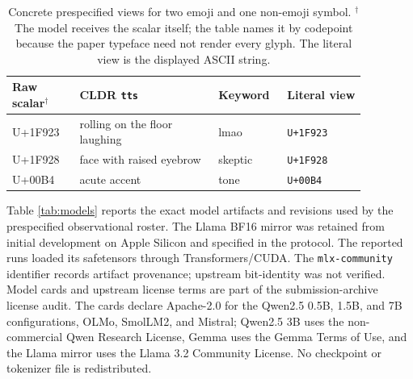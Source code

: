 \documentclass{article}
\begin{document}
\begin{table}[H]
\centering
\scriptsize
\setlength{\tabcolsep}{2.5pt}
\begin{tabular}{p{0.17\linewidth}p{0.35\linewidth}p{0.15\linewidth}p{0.20\linewidth}}
\toprule
Raw scalar$^\dagger$ & CLDR \texttt{tts} & Keyword & Literal view \\
\midrule
U+1F923 & rolling on the floor laughing & lmao & \texttt{U+1F923} \\
U+1F928 & face with raised eyebrow & skeptic & \texttt{U+1F928} \\
U+00B4  & acute accent & tone & \texttt{U+00B4} \\
\bottomrule
\end{tabular}
\caption{Concrete prespecified views for two emoji and one non-emoji symbol.
$^\dagger$The model receives the scalar itself; the table names it by codepoint
because the paper typeface need not render every glyph. The literal view is
the displayed ASCII string.}
\label{tab:examples}
\end{table}

Table \ref{tab:models} reports the exact model artifacts and revisions used by
the prespecified observational roster. The Llama BF16 mirror was retained
from initial development on Apple Silicon and specified in the protocol.
The reported runs loaded its safetensors through Transformers/CUDA.
The \texttt{mlx-community} identifier records artifact provenance; upstream
bit-identity was not verified. Model cards
and upstream license terms are part of the submission-archive license audit.
The cards declare Apache-2.0 for the Qwen2.5 0.5B, 1.5B, and 7B configurations, OLMo,
SmolLM2, and Mistral; Qwen2.5 3B uses the non-commercial Qwen Research
License, Gemma uses the Gemma Terms of Use, and the Llama mirror uses the
Llama 3.2 Community License. No checkpoint or tokenizer file is redistributed.
\end{document}
